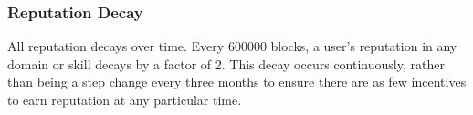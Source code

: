 \subsubsection{Reputation Decay}
All reputation decays over time. Every 600000 blocks, a user's reputation in any domain or skill decays by a factor of 2. This decay occurs continuously, rather than being a step change every three months to ensure there are as few incentives to earn reputation at any particular time.






